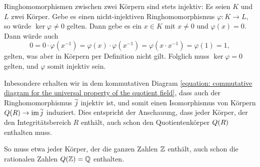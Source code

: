 \begin{remark}
  Ringhomomorphismen zwischen zwei Körpern sind stets injektiv:
  Es seien $K$ und $L$ zwei Körper.
  Gebe es einen nicht-injektiven Ringhomomorphismus $\varphi \colon K \to L$, so würde $\ker \varphi \neq 0$ gelten.
  Dann gebe es ein $x \in K$ mit $x \neq 0$ und $\varphi(x) = 0$.
  Dann würde auch
  \[
      0
    = 0 \cdot \varphi(x^{-1})
    = \varphi(x) \cdot \varphi(x^{-1})
    = \varphi(x \cdot x^{-1})
    = \varphi(1)
    = 1,
  \]
  gelten, was aber in Körpern per Definition nicht gilt.
  Folglich muss $\ker \varphi = 0$ gelten, und $\varphi$ somit injektiv sein.
  
  Inbesondere erhalten wir in dem kommutativen Diagram \eqref{equation: commutative diagram for the universal property of the quotient field}, dass auch der Ringhomomorphismus $\overline{j}$ injektiv ist, und somit einen Isomorphismus von Körpern $Q(R) \to \operatorname{im} \overline{j}$ induziert.
  Dies entspricht der Anschauung, dass jeder Körper, der den Integritätsbereich $R$ enthält, auch schon den Quotientenkörper $Q(R)$ enthalten muss.
  
  So muss etwa jeder Körper, der die ganzen Zahlen $\mathbb{Z}$ enthält, auch schon die rationalen Zahlen $Q(\mathbb{Z}) = \mathbb{Q}$ enthalten.
\end{remark}


